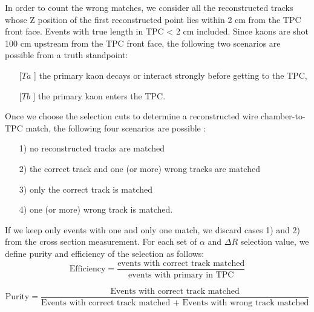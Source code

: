 In order to count the wrong matches, we consider all the reconstructed tracks whose Z position of the first reconstructed point lies within 2 cm from the TPC front face. Events with true length in TPC < 2 cm included. 
Since kaons are shot 100 cm upstream from the TPC front face, the following two scenarios are possible from a truth standpoint: 
\begin{itemize}
\item[[$Ta$]] the primary kaon decays or interact strongly before getting to the TPC,
\item[[$Tb$]] the primary kaon enters the TPC.
\end{itemize}

Once we choose the selection cuts to determine a reconstructed wire chamber-to-TPC match, the following four scenarios are possible : 
\begin{itemize}
\item[1)] no reconstructed tracks are matched
\item[2)] the correct track and one (or more) wrong tracks are matched
\item[3)] only the correct track is matched
\item[4)] one (or more) wrong track is matched.
\end{itemize}

If we keep only events with one and only one match, we discard cases 1) and 2) from the cross section measurement. For each set of $\alpha$ and $\Delta R$ selection value, we define purity and efficiency of the selection as follows:
\begin{equation}
\text{Efficiency} = \frac{\text{events with correct track matched}}{\text{events with primary in TPC}}
\end{equation}

\begin{equation}
\text{Purity} = \frac{\text{Events with correct track matched}}{\text{Events with correct track matched + Events with wrong track matched}}
\end{equation}
